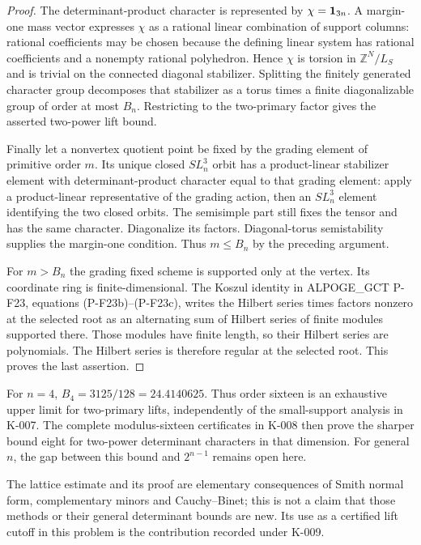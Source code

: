 \begin{proof}
The determinant-product character is represented by
$\chi={\bf1}_{3n}$.  A margin-one mass vector expresses $\chi$
as a rational linear combination of support columns: rational
coefficients may be chosen because the defining linear system has
rational coefficients and a nonempty rational polyhedron.
Hence $\chi$ is torsion in $\mathbb Z^N/L_S$ and is trivial on
the connected diagonal stabilizer.  Splitting the finitely generated
character group decomposes that stabilizer as a torus times a finite
diagonalizable group of order at most $B_n$.  Restricting to the
two-primary factor gives the asserted two-power lift bound.

Finally let a nonvertex quotient point be fixed by the grading
element of primitive order $m$.  Its unique closed $SL_n^3$ orbit
has a product-linear stabilizer element with determinant-product
character equal to that grading element: apply a product-linear
representative of the grading action, then an $SL_n^3$ element
identifying the two closed orbits.  The semisimple part still fixes
the tensor and has the same character.  Diagonalize its factors.
Diagonal-torus semistability supplies the margin-one condition.
Thus $m\le B_n$ by the preceding argument.

For $m>B_n$ the grading fixed scheme is supported only at the
vertex.  Its coordinate ring is finite-dimensional.  The Koszul
identity in ALPOGE\_GCT P-F23, equations (P-F23b)--(P-F23c), writes
the Hilbert series times factors nonzero at the selected root as
an alternating sum of Hilbert series of finite modules supported
there.  Those modules have finite length, so their Hilbert series
are polynomials.  The Hilbert series is therefore regular at the
selected root.  This proves the last assertion.
\end{proof}

For $n=4$, $B_4=3125/128=24.4140625$.  Thus order sixteen is an
exhaustive upper limit for two-primary lifts, independently of the
small-support analysis in K-007.  The complete modulus-sixteen
certificates in K-008 then prove the sharper bound eight for
two-power determinant characters in that dimension.  For general
$n$, the gap between this bound and $2^{n-1}$ remains open here.

The lattice estimate and its proof are elementary consequences of
Smith normal form, complementary minors and Cauchy--Binet; this is
not a claim that those methods or their general determinant bounds
are new.  Its use as a certified lift cutoff in this problem is
the contribution recorded under K-009.
